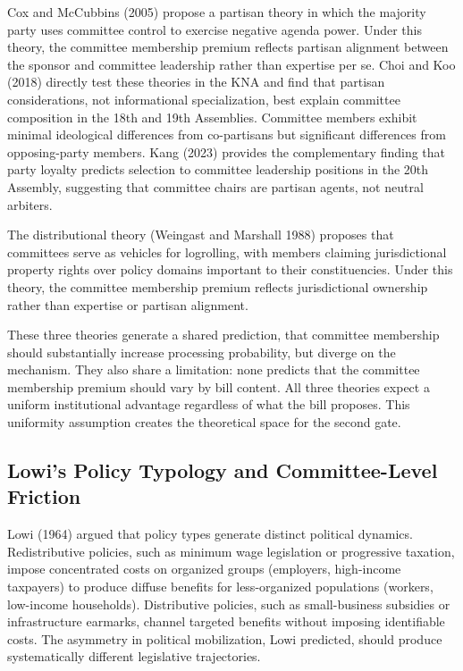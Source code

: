 \documentclass[11pt]{article}
\begin{document}
Cox and McCubbins (2005) propose a partisan theory in which the majority party uses committee control to exercise negative agenda power. Under this theory, the committee membership premium reflects partisan alignment between the sponsor and committee leadership rather than expertise per se. Choi and Koo (2018) directly test these theories in the KNA and find that partisan considerations, not informational specialization, best explain committee composition in the 18th and 19th Assemblies. Committee members exhibit minimal ideological differences from co-partisans but significant differences from opposing-party members. Kang (2023) provides the complementary finding that party loyalty predicts selection to committee leadership positions in the 20th Assembly, suggesting that committee chairs are partisan agents, not neutral arbiters.

The distributional theory (Weingast and Marshall 1988) proposes that committees serve as vehicles for logrolling, with members claiming jurisdictional property rights over policy domains important to their constituencies. Under this theory, the committee membership premium reflects jurisdictional ownership rather than expertise or partisan alignment.

These three theories generate a shared prediction, that committee membership should substantially increase processing probability, but diverge on the mechanism. They also share a limitation: none predicts that the committee membership premium should vary by bill content. All three theories expect a uniform institutional advantage regardless of what the bill proposes. This uniformity assumption creates the theoretical space for the second gate.

\subsection{Lowi's Policy Typology and Committee-Level Friction}

Lowi (1964) argued that policy types generate distinct political dynamics. Redistributive policies, such as minimum wage legislation or progressive taxation, impose concentrated costs on organized groups (employers, high-income taxpayers) to produce diffuse benefits for less-organized populations (workers, low-income households). Distributive policies, such as small-business subsidies or infrastructure earmarks, channel targeted benefits without imposing identifiable costs. The asymmetry in political mobilization, Lowi predicted, should produce systematically different legislative trajectories.
\end{document}
